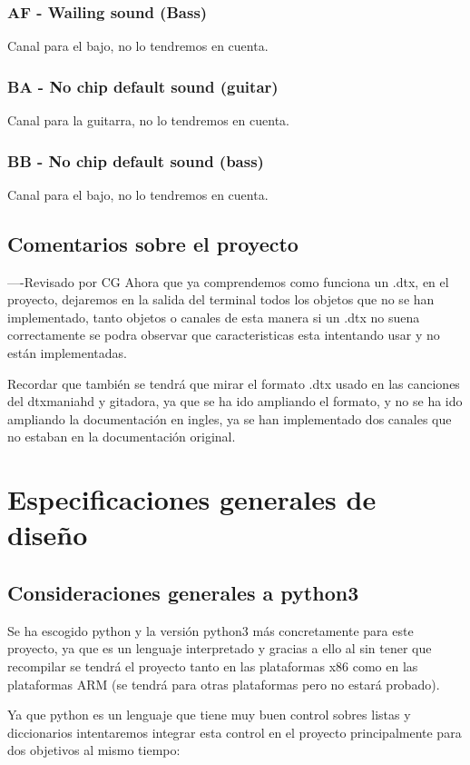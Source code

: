 \documentclass[a4paper,11pt,oneside]{book}
\begin{document}
\subsection{AF - Wailing sound (Bass)}
Canal para el bajo, no lo tendremos en cuenta.

\subsection{BA - No chip default sound (guitar)}
Canal para la guitarra, no lo tendremos en cuenta.

\subsection{BB - No chip default sound (bass)}
Canal para el bajo, no lo tendremos en cuenta.


\section{Comentarios sobre el proyecto}

----Revisado por CG
Ahora que ya comprendemos como funciona un .dtx, en el proyecto, dejaremos en la salida del terminal todos los objetos que no se han implementado, tanto objetos o canales de esta manera si un .dtx no suena correctamente se podra observar que caracteristicas esta intentando usar y no están implementadas.

Recordar que también se tendrá que mirar el formato .dtx usado en las canciones del dtxmaniahd y gitadora, ya que se ha ido ampliando el formato, y no se ha ido ampliando la documentación en ingles, ya se han implementado dos canales que no estaban en la documentación original.

\chapter{Especificaciones generales de diseño}
\section{Consideraciones generales a python3}
Se ha escogido python y la versión python3 más concretamente para este proyecto, ya que es un lenguaje interpretado y gracias a ello al sin tener que recompilar se tendrá el proyecto tanto en las plataformas x86 como en las plataformas ARM (se tendrá para otras plataformas pero no estará probado).

Ya que python es un lenguaje que tiene muy buen control sobres listas y diccionarios intentaremos integrar esta control en el proyecto principalmente para dos objetivos al mismo tiempo:
\end{document}
